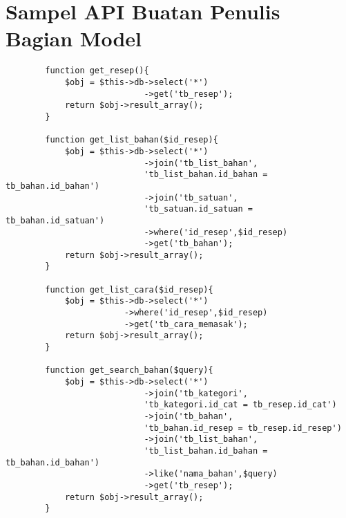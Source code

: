 \documentclass{jtetiskripsi}
\begin{document}




\chapter{Sampel API Buatan Penulis Bagian Model}
	\begin{verbatim}
		function get_resep(){
			$obj = $this->db->select('*')
							->get('tb_resep');
			return $obj->result_array();
		}
		
		function get_list_bahan($id_resep){
			$obj = $this->db->select('*')
							->join('tb_list_bahan',
							'tb_list_bahan.id_bahan = tb_bahan.id_bahan')
							->join('tb_satuan',
							'tb_satuan.id_satuan = tb_bahan.id_satuan')
							->where('id_resep',$id_resep)
							->get('tb_bahan');
			return $obj->result_array();
		}
		
		function get_list_cara($id_resep){
			$obj = $this->db->select('*')
						->where('id_resep',$id_resep)
						->get('tb_cara_memasak');
			return $obj->result_array();
		}
		
		function get_search_bahan($query){
			$obj = $this->db->select('*')
							->join('tb_kategori',
							'tb_kategori.id_cat = tb_resep.id_cat')
							->join('tb_bahan',
							'tb_bahan.id_resep = tb_resep.id_resep')
							->join('tb_list_bahan',
							'tb_list_bahan.id_bahan = tb_bahan.id_bahan')
							->like('nama_bahan',$query)
							->get('tb_resep');
			return $obj->result_array();
		}
		
	\end{verbatim}	
\end{document}
